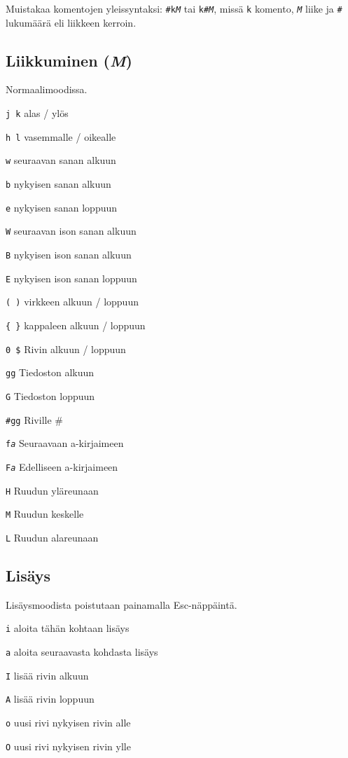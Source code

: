 \documentclass{article}
\newcommand{\com}[1]{{\large{\texttt{#1}}}}
\newcommand{\Com}[1]{\com{#1}  }
\newcommand{\M}{{\large{\textit{M}}}}
\begin{document}

\begin{multicols}{4}

Muistakaa komentojen yleissyntaksi: \com{\#k\M} tai \com{k\#\M}, missä \com{k} komento, \com{\M} liike ja \com{\#} lukumäärä eli liikkeen kerroin.

\subsection*{Liikkuminen (\M)}
Normaalimoodissa.
\begin{description}
\item{\Com{j k}}  alas / ylös 
\item{\Com{h l}}  vasemmalle / oikealle 
\item{\Com{w}}  seuraavan sanan alkuun 
\item{\Com{b}}  nykyisen sanan alkuun 
\item{\Com{e}}  nykyisen sanan loppuun 
\item{\Com{W}}  seuraavan ison sanan alkuun 
\item{\Com{B}}  nykyisen ison sanan alkuun 
\item{\Com{E}}  nykyisen ison sanan loppuun 
\item{\Com{( )}}  virkkeen alkuun / loppuun
\item{\Com{\{ \}}}  kappaleen alkuun / loppuun
\item{\Com{0 \$}} Rivin alkuun / loppuun
\item{\Com{gg}}  Tiedoston alkuun 
\item{\Com{G}}  Tiedoston loppuun 
\item{\Com{\#gg}} Riville \#
\item{\Com{f\emph{a}}} Seuraavaan a-kirjaimeen
\item{\Com{F\emph{a}}} Edelliseen a-kirjaimeen
\item{\Com{H}} Ruudun yläreunaan
\item{\Com{M}} Ruudun keskelle
\item{\Com{L}} Ruudun alareunaan
\end{description}

\subsection*{Lisäys}
Lisäysmoodista poistutaan painamalla Esc-näppäintä.
\begin{description}
\item{\Com{i}}  aloita tähän kohtaan lisäys 
\item{\Com{a}}  aloita seuraavasta kohdasta lisäys 
\item{\Com{I}}  lisää rivin alkuun 
\item{\Com{A}}  lisää rivin loppuun 
\item{\Com{o}}  uusi rivi nykyisen rivin alle 
\item{\Com{O}}  uusi rivi nykyisen rivin ylle 
\end{description}


\end{multicols}
\end{document}
